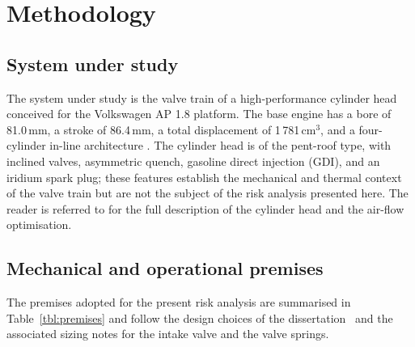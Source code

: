 
\section{Methodology}\label{sec:methodology}

\subsection{System under study}\label{sec:method-system}

The system under study is the valve train of a high-performance cylinder
head conceived for the Volkswagen AP 1.8 platform. The base engine has a
bore of 81.0\,mm, a stroke of 86.4\,mm, a total displacement of
1\,781\,cm$^{3}$, and a four-cylinder in-line architecture
\citep[][\S~1.1]{porto2026dissertation}. The cylinder head is of the
pent-roof type, with inclined valves, asymmetric quench, gasoline direct
injection (GDI), and an iridium spark plug; these features establish the
mechanical and thermal context of the valve train but are not the
subject of the risk analysis presented here. The reader is referred to
\citet{porto2026dissertation} for the full description of the cylinder
head and the air-flow optimisation.

\subsection{Mechanical and operational premises}
\label{sec:method-premises}

The premises adopted for the present risk analysis are summarised in
Table~\ref{tbl:premises} and follow the design choices of the
dissertation~\citep{porto2026dissertation} and the associated sizing
notes for the intake valve and the valve springs.

